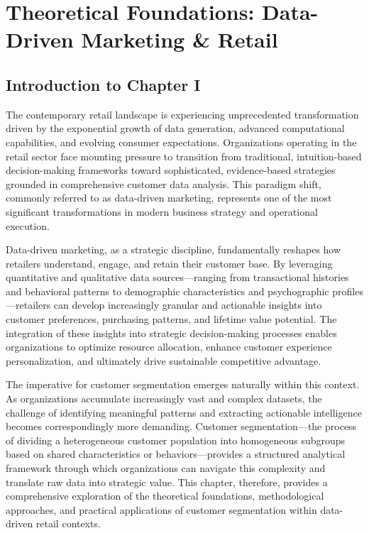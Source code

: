 \documentclass[12pt,a4paper,oneside]{report}
\begin{document}
\chapter{Theoretical Foundations: Data-Driven Marketing \& Retail}

\section*{Introduction to Chapter I}

The contemporary retail landscape is experiencing unprecedented transformation driven by the exponential growth of data generation, advanced computational capabilities, and evolving consumer expectations. Organizations operating in the retail sector face mounting pressure to transition from traditional, intuition-based decision-making frameworks toward sophisticated, evidence-based strategies grounded in comprehensive customer data analysis. This paradigm shift, commonly referred to as data-driven marketing, represents one of the most significant transformations in modern business strategy and operational execution.

Data-driven marketing, as a strategic discipline, fundamentally reshapes how retailers understand, engage, and retain their customer base. By leveraging quantitative and qualitative data sources—ranging from transactional histories and behavioral patterns to demographic characteristics and psychographic profiles—retailers can develop increasingly granular and actionable insights into customer preferences, purchasing patterns, and lifetime value potential. The integration of these insights into strategic decision-making processes enables organizations to optimize resource allocation, enhance customer experience personalization, and ultimately drive sustainable competitive advantage.

The imperative for customer segmentation emerges naturally within this context. As organizations accumulate increasingly vast and complex datasets, the challenge of identifying meaningful patterns and extracting actionable intelligence becomes correspondingly more demanding. Customer segmentation—the process of dividing a heterogeneous customer population into homogeneous subgroups based on shared characteristics or behaviors—provides a structured analytical framework through which organizations can navigate this complexity and translate raw data into strategic value. This chapter, therefore, provides a comprehensive exploration of the theoretical foundations, methodological approaches, and practical applications of customer segmentation within data-driven retail contexts.
\end{document}
